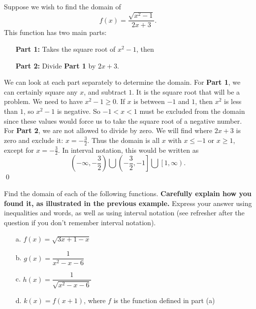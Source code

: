 \begin{eg} Suppose we wish to find the domain of
\[
f(x) = \frac{\sqrt{x^2-1}}{2x+3}.
\]
This function has two main parts:
\begin{enumerate}
\item[\bf Part 1:] Takes the square root of $x^2-1$, then
\item[\bf Part 2:]  Divide {\bf Part 1} by $2x+3$.
\end{enumerate}
We can look at each part separately to determine the domain. For {\bf Part 1}, we can certainly square any  $x$, and subtract $1$.  It is the square root that will be a problem.  We need to have $x^2-1 \geq 0$.   If $x$ is between $-1$ and $1$, then $x^2$ is less than $1$, so $x^2-1$ is negative. So $-1<x<1$ must be excluded from the domain since these values would force us to take the square root of a negative number. For {\bf Part 2},  we are not allowed to divide by zero.  We will find where $2x+3$ is zero and exclude it:   $x=-\frac{3}{2}$. Thus the domain is all $x$ with $x\leq -1$ or $x\geq 1$, except for $x=-\frac{3}{2}$. In interval notation, this would be written as
\[
\left(-\infty,-\frac{3}{2}\right)\bigcup \left(-\frac{3}{2},-1\right] \bigcup \left[1,\infty\right).
\]     
\qed \end{eg}

\begin{question} Find the domain of each of the following functions. {\bf Carefully explain how you found it, as illustrated in the previous example.} Express your answer using inequalities and words, as well as using interval notation (see refresher after the question if you don't remember interval notation).
\begin{enumerate}
\item[a.] $f(x) = \sqrt{3x + 1-x}$
\item[b.] $g(x) = \dfrac{1}{x^2-x-6}$
\item[c.] $h(x) = \dfrac{1}{\sqrt{x^2-x-6}}$
\item[d.] $k(x) = f(x+1)$, where $f$ is the function defined in part (a)
\end{enumerate}
\end{question}

